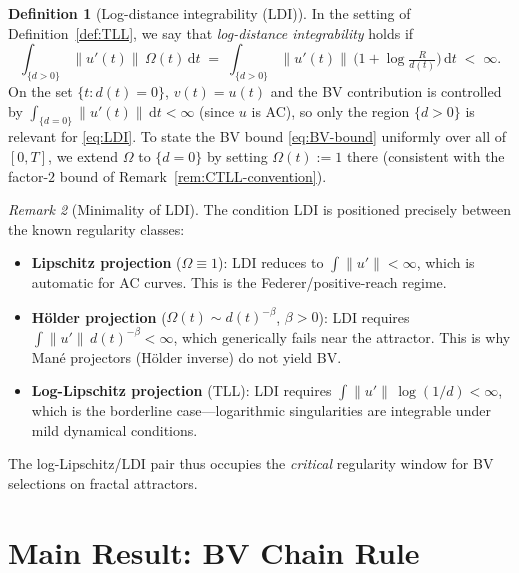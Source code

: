\documentclass[12pt,a4paper]{article}
\theoremstyle{definition}
\newtheorem{definition}{Definition}[section]
\theoremstyle{plain}
\theoremstyle{remark}
\newtheorem{remark}[definition]{Remark}
\begin{document}
\begin{definition}[Log-distance integrability (LDI)]
\label{def:LDI}
In the setting of Definition~\ref{def:TLL}, we say that
\emph{log-distance integrability} holds if
\begin{equation}\label{eq:LDI}
  \int_{\{d>0\}} \|u'(t)\|\,\Omega(t)\,\mathrm{d}t
  \;=\;
  \int_{\{d>0\}} \|u'(t)\|\,
  \bigl(1 + \log\tfrac{R}{d(t)}\bigr)\,\mathrm{d}t
  \;<\; \infty.
  \tag{LDI}
\end{equation}
On the set $\{t : d(t) = 0\}$, $v(t) = u(t)$ and the BV
contribution is controlled by $\int_{\{d=0\}} \|u'(t)\|\,\mathrm{d}t
< \infty$ (since $u$ is AC), so only the region $\{d > 0\}$
is relevant for \eqref{eq:LDI}.  To state the BV bound
\eqref{eq:BV-bound} uniformly over all of $[0,T]$, we
extend $\Omega$ to $\{d=0\}$ by setting $\Omega(t) := 1$
there (consistent with the factor-$2$ bound of
Remark~\ref{rem:CTLL-convention}).
\end{definition}

\begin{remark}[Minimality of LDI]
\label{rem:LDI-minimal}
The condition LDI is positioned precisely between the known
regularity classes:
\begin{itemize}
  \item \textbf{Lipschitz projection} ($\Omega \equiv 1$):
    LDI reduces to $\int \|u'\| < \infty$, which is automatic
    for AC curves.  This is the Federer/positive-reach regime.
  \item \textbf{H\"older projection} ($\Omega(t) \sim d(t)^{-\beta}$,
    $\beta > 0$): LDI requires $\int \|u'\|\,d(t)^{-\beta} < \infty$,
    which generically fails near the attractor.  This is why
    Man\'e projectors (H\"older inverse) do not yield BV.
  \item \textbf{Log-Lipschitz projection} (TLL):
    LDI requires $\int \|u'\|\,\log(1/d) < \infty$, which is the
    borderline case---logarithmic singularities are integrable
    under mild dynamical conditions.
\end{itemize}
The log-Lipschitz/LDI pair thus occupies the \emph{critical}
regularity window for BV selections on fractal attractors.
\end{remark}


\section{Main Result: BV Chain Rule}
\label{sec:main}
\end{document}
